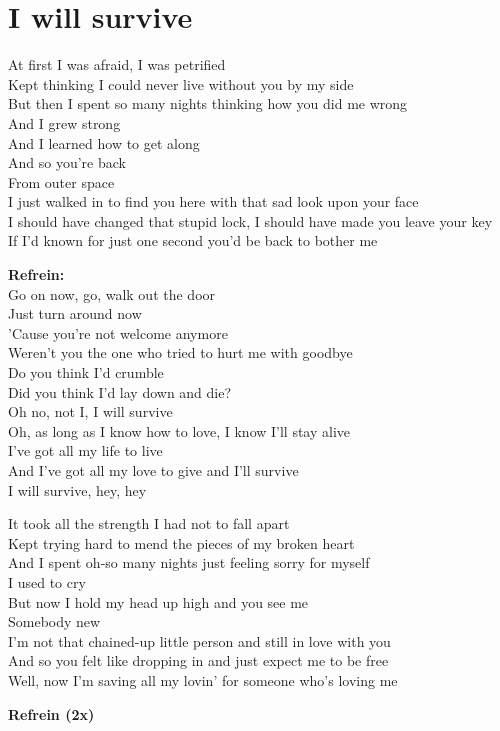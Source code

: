 \section{I will survive}
At first I was afraid, I was petrified\\
Kept thinking I could never live without you by my side\\
But then I spent so many nights thinking how you did me wrong\\
And I grew strong\\
And I learned how to get along\\
And so you're back\\
From outer space\\
I just walked in to find you here with that sad look upon your face\\
I should have changed that stupid lock, I should have made you leave your key\\
If I'd known for just one second you'd be back to bother me

\textbf{Refrein:}\\
Go on now, go, walk out the door\\
Just turn around now\\
'Cause you're not welcome anymore\\
Weren't you the one who tried to hurt me with goodbye\\
Do you think I'd crumble\\
Did you think I'd lay down and die?\\
Oh no, not I, I will survive\\
Oh, as long as I know how to love, I know I'll stay alive\\
I've got all my life to live\\
And I've got all my love to give and I'll survive\\
I will survive, hey, hey

It took all the strength I had not to fall apart\\
Kept trying hard to mend the pieces of my broken heart\\
And I spent oh-so many nights just feeling sorry for myself\\
I used to cry\\
But now I hold my head up high and you see me\\
Somebody new\\
I'm not that chained-up little person and still in love with you\\
And so you felt like dropping in and just expect me to be free\\
Well, now I'm saving all my lovin' for someone who's loving me

\textbf{Refrein (2x)}